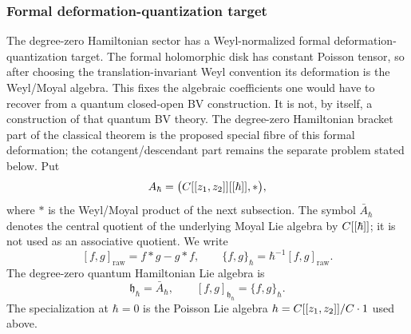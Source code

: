 \documentclass[11pt]{memoir}
\begin{document}
\subsubsection{Formal deformation-quantization target}

The degree-zero Hamiltonian sector has a Weyl-normalized formal
deformation-quantization target. The formal holomorphic disk has constant
Poisson tensor, so after choosing the translation-invariant Weyl convention
its deformation is the Weyl/Moyal algebra. This fixes the algebraic
coefficients one would have to recover from a quantum closed-open BV
construction. It is not, by itself, a
construction of that quantum BV theory. The degree-zero Hamiltonian bracket
part of the classical theorem is the proposed special fibre of this formal
deformation; the cotangent/descendant part remains the separate problem stated
below.
Put
$$A_\hbar=\bigl(C[[z_1,z_2]][[\hbar]],*\bigr),$$
where $*$ is the Weyl/Moyal product of the next subsection. The symbol
$\bar A_\hbar$ denotes the central quotient of the underlying Moyal Lie algebra
by $C[[\hbar]]$; it is not used as an associative quotient. We write
$$[f,g]_{\mathrm{raw}}=f*g-g*f,\qquad
  \{f,g\}_\hbar=\hbar^{-1}[f,g]_{\mathrm{raw}}.$$
The degree-zero quantum Hamiltonian Lie algebra is
$$\mathfrak h_\hbar=\bar A_\hbar,\qquad
  [f,g]_{\mathfrak h_\hbar}=\{f,g\}_\hbar.$$
The specialization at $\hbar=0$ is the Poisson Lie algebra
$h=C[[z_1,z_2]]/C\cdot1$ used above.
\end{document}
